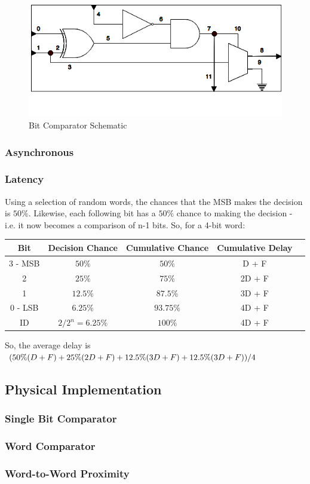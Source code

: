 \documentclass[11pt]{scrartcl}
\begin{document}
\begin{figure}[hbtp]
\centering
\includegraphics[scale=.7]{BitComparatorSchematic.png}
\caption{Bit Comparator Schematic}
\end{figure}


\subsubsection{Asynchronous}
\subsubsection{Latency}
Using a selection of random words, the chances that the MSB makes the decision is $50\%$. Likewise, each following bit has a $50\%$ chance to making the decision - i.e. it now becomes a comparison of n-1 bits. So, for a 4-bit word:

\begin{table}
\centering
\begin{tabular}{ c | c | c || c | c  }
Bit & Decision Chance & Cumulative Chance & Cumulative Delay   \\
\hline
3 - MSB & $50\%$ & $50\%$ & D + F \\
2           & $25\%$ & $75\%$ & 2D + F\\
1           & $12.5\%$ & $87.5\%$ & 3D + F\\
0 - LSB & $6.25\%$ & $93.75\%$ & 4D + F\\
ID & $2/2^n=6.25\%$ & $100\%$ & 4D + F\\


\end{tabular}
 \label{tab:title} 
\end{table}

So, the average delay is $(50\% \* (D + F) + 25\% \* (2D + F) + 12.5\% \* (3D + F) + 12.5\% \* (3D + F))/4$


\subsection{Physical Implementation}
\subsubsection{Single Bit Comparator}
\subsubsection{Word Comparator}
\subsubsection{Word-to-Word Proximity}

	      	   
\end{document}
